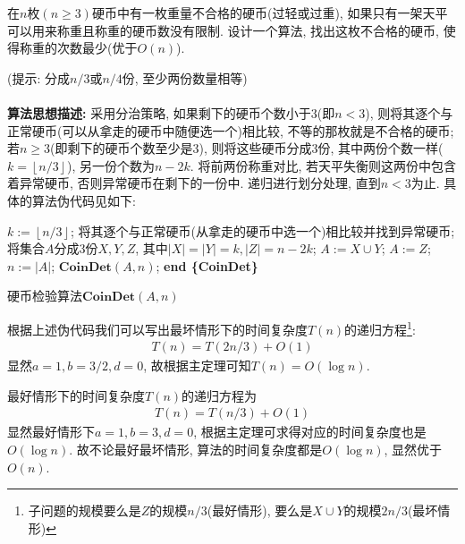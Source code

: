 \documentclass{article}
\begin{document}
\pagebreak

\begin{homeworkProblem}
	在$n$枚$(n\geq 3)$硬币中有一枚重量不合格的硬币(过轻或过重), 如果只有一架天平可以用来称重且称重的硬币数没有限制. 设计一个算法, 找出这枚不合格的硬币, 使得称重的次数最少(优于$O(n)$).
	
	(提示: 分成$n/3$或$n/4$份, 至少两份数量相等)
	\\

	\solution
	\\

	\textbf{算法思想描述:} 采用分治策略, 如果剩下的硬币个数小于3(即$n<3$), 则将其逐个与正常硬币(可以从拿走的硬币中随便选一个)相比较, 不等的那枚就是不合格的硬币; 若$n\geq 3$(即剩下的硬币个数至少是3), 则将这些硬币分成3份, 其中两份个数一样($k=\left\lfloor n/3\right\rfloor $), 另一份个数为$n-2k$. 将前两份称重对比, 若天平失衡则这两份中包含着异常硬币, 否则异常硬币在剩下的一份中. 递归进行划分处理, 直到$n<3$为止. 具体的算法伪代码见如下:
	\begin{algorithm}[H]
		\begin{algorithmic}[1]
		\State $k:=\left\lfloor n/3\right\rfloor $;
			\State 将其逐个与正常硬币(从拿走的硬币中选一个)相比较并找到异常硬币; 
		\Else
			\State 将集合$A$分成3份$X,Y,Z$, 其中$\left\lvert X\right\rvert =\left\lvert Y\right\rvert =k,\left\lvert Z\right\rvert =n-2k$;
			 
				\State $A:=X\cup Y$;
			\Else
				\State $A:=Z$;
			\EndIf
			\State $n:=\left\lvert A\right\rvert $;
			\State $\textbf{CoinDet}(A,n)$;
		\EndIf
		\State \textbf{end \{CoinDet\}}
		\end{algorithmic}
		\caption{硬币检验算法$\textbf{CoinDet}(A,n)$}
		\label{alg:CoinDet算法}
	\end{algorithm}
	根据上述伪代码我们可以写出最坏情形下的时间复杂度$T(n)$的递归方程\footnote{子问题的规模要么是$Z$的规模$n/3$(最好情形), 要么是$X\cup Y$的规模$2n/3$(最坏情形)}:
	\begin{align}
		T\left( n \right) =T\left( 2n/3 \right) +O\left( 1 \right) 
	\end{align}
	显然$a=1,b=3/2,d=0$, 故根据主定理可知$T(n)=O(\log n)$.

	最好情形下的时间复杂度$T(n)$的递归方程为
	\begin{align}
		T(n)=T(n/3)+O(1)
	\end{align}
	显然最好情形下$a=1,b=3,d=0$, 根据主定理可求得对应的时间复杂度也是$O(\log n)$.
	故不论最好最坏情形, 算法的时间复杂度都是$O(\log n)$, 显然优于$O(n)$.
	\newpage
\end{homeworkProblem}
\end{document}
